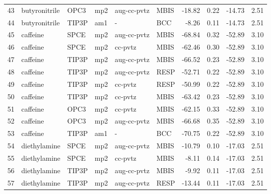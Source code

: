 \begin{tabular}{llllllrrrr}
43  &                  butyronitrile &       OPC3 &      mp2 &  aug-cc-pvtz &         MBIS & -18.82 &      0.22 &      -14.73 &     2.51 \\
44  &                  butyronitrile &      TIP3P &      am1 &            - &          BCC &  -8.26 &      0.11 &      -14.73 &     2.51 \\
45  &                       caffeine &       SPCE &      mp2 &  aug-cc-pvtz &         MBIS & -68.84 &      0.32 &      -52.89 &     3.10 \\
46  &                       caffeine &       SPCE &      mp2 &      cc-pvtz &         MBIS & -62.46 &      0.30 &      -52.89 &     3.10 \\
47  &                       caffeine &      TIP3P &      mp2 &  aug-cc-pvtz &         MBIS & -66.52 &      0.23 &      -52.89 &     3.10 \\
48  &                       caffeine &      TIP3P &      mp2 &  aug-cc-pvtz &         RESP & -52.71 &      0.22 &      -52.89 &     3.10 \\
49  &                       caffeine &      TIP3P &      mp2 &      cc-pvtz &         RESP & -50.99 &      0.22 &      -52.89 &     3.10 \\
50  &                       caffeine &      TIP3P &      mp2 &      cc-pvtz &         MBIS & -63.42 &      0.23 &      -52.89 &     3.10 \\
51  &                       caffeine &       OPC3 &      mp2 &      cc-pvtz &         MBIS & -62.15 &      0.33 &      -52.89 &     3.10 \\
52  &                       caffeine &       OPC3 &      mp2 &  aug-cc-pvtz &         MBIS & -66.68 &      0.35 &      -52.89 &     3.10 \\
53  &                       caffeine &      TIP3P &      am1 &            - &          BCC & -70.75 &      0.22 &      -52.89 &     3.10 \\
54  &                   diethylamine &       SPCE &      mp2 &  aug-cc-pvtz &         MBIS & -10.79 &      0.10 &      -17.03 &     2.51 \\
55  &                   diethylamine &       SPCE &      mp2 &      cc-pvtz &         MBIS &  -8.11 &      0.14 &      -17.03 &     2.51 \\
56  &                   diethylamine &      TIP3P &      mp2 &  aug-cc-pvtz &         MBIS &  -9.92 &      0.11 &      -17.03 &     2.51 \\
57  &                   diethylamine &      TIP3P &      mp2 &  aug-cc-pvtz &         RESP & -13.44 &      0.11 &      -17.03 &     2.51 \\

\end{tabular}
